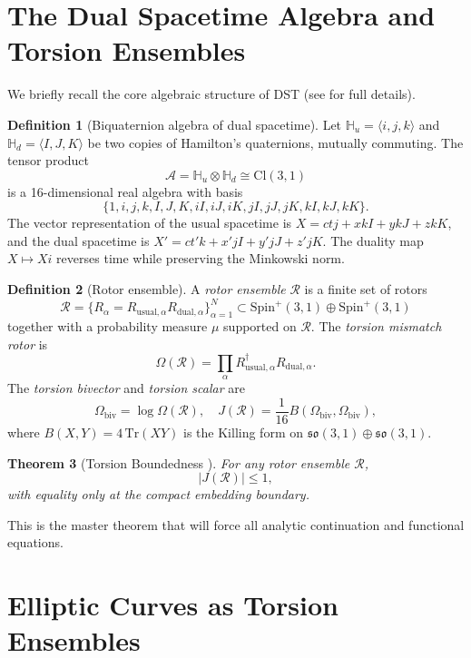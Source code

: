\documentclass[dvipdfmx,11pt,a4paper]{article}
\newtheorem{theorem}{Theorem}[section]
\theoremstyle{definition}
\newtheorem{definition}[theorem]{Definition}
\begin{document}
\section{The Dual Spacetime Algebra and Torsion Ensembles}

We briefly recall the core algebraic structure of DST (see \cite{DST2025} for full details).

\begin{definition}[Biquaternion algebra of dual spacetime]
Let $\mathbb{H}_u = \langle i,j,k \rangle$ and $\mathbb{H}_d = \langle I,J,K \rangle$ be two copies of Hamilton’s quaternions, mutually commuting. The tensor product
\[
\mathcal{A} = \mathbb{H}_u \otimes \mathbb{H}_d \cong \mathrm{Cl}(3,1)
\]
is a 16-dimensional real algebra with basis
\[
\{1,i,j,k,I,J,K,iI,iJ,iK,jI,jJ,jK,kI,kJ,kK\}.
\]
The vector representation of the usual spacetime is $X = ct j + x kI + y kJ + z kK$, and the dual spacetime is $X' = ct' k + x' jI + y' jJ + z' jK$. The duality map $X \mapsto Xi$ reverses time while preserving the Minkowski norm.
\end{definition}

\begin{definition}[Rotor ensemble]
A \emph{rotor ensemble} $\mathcal{R}$ is a finite set of rotors
\[
\mathcal{R} = \{R_\alpha = R_{\mathrm{usual},\alpha} R_{\mathrm{dual},\alpha}\}_{\alpha=1}^N \subset \mathrm{Spin}^+(3,1) \oplus \mathrm{Spin}^+(3,1)
\]
together with a probability measure $\mu$ supported on $\mathcal{R}$. The \emph{torsion mismatch rotor} is
\[
\Omega(\mathcal{R}) = \prod_{\alpha} R_{\mathrm{usual},\alpha}^\dagger R_{\mathrm{dual},\alpha}.
\]
The \emph{torsion bivector} and \emph{torsion scalar} are
\[
\Omega_{\mathrm{biv}} = \log \Omega(\mathcal{R}), \quad J(\mathcal{R}) = \frac{1}{16} B(\Omega_{\mathrm{biv}},\Omega_{\mathrm{biv}}),
\]
where $B(X,Y) = 4\,\mathrm{Tr}(XY)$ is the Killing form on $\mathfrak{so}(3,1)\oplus\mathfrak{so}(3,1)$.
\end{definition}

\begin{theorem}[Torsion Boundedness \cite{DST2025}]
For any rotor ensemble $\mathcal{R}$,
\[
|J(\mathcal{R})| \leq 1,
\]
with equality only at the compact embedding boundary.
\end{theorem}

This is the master theorem that will force all analytic continuation and functional equations.

\section{Elliptic Curves as Torsion Ensembles}
\end{document}
